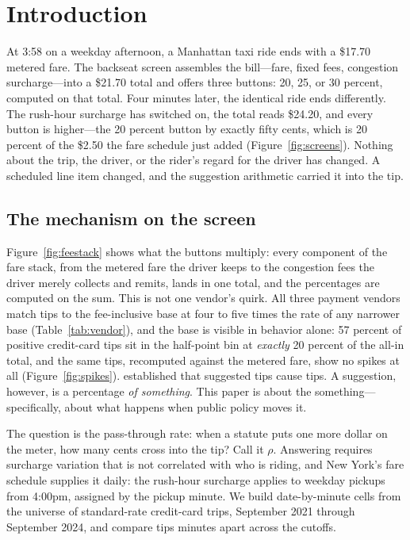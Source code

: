 \section{Introduction}
\label{sec:introduction}

At 3:58 on a weekday afternoon, a Manhattan taxi ride ends with a
\$17.70 metered fare. The backseat screen assembles the bill---fare,
fixed fees, congestion surcharge---into a \$21.70 total and offers three
buttons: 20, 25, or 30 percent, computed on that total. Four minutes
later, the identical ride ends differently. The rush-hour surcharge has
switched on, the total reads \$24.20, and every button is higher---the
20 percent button by exactly fifty cents, which is 20 percent of the
\$2.50 the fare schedule just added (Figure~\ref{fig:screens}). Nothing
about the trip, the driver, or the rider's regard for the driver has
changed. A scheduled line item changed, and the suggestion arithmetic
carried it into the tip.

\subsection{The mechanism on the screen}
Figure~\ref{fig:feestack} shows what the buttons multiply: every
component of the fare stack, from the metered fare the driver keeps to
the congestion fees the driver merely collects and remits, lands in one
total, and the percentages are computed on the sum. This is not one
vendor's quirk. All three payment vendors match tips to the
fee-inclusive base at four to five times the rate of any narrower base
(Table~\ref{tab:vendor}), and the base is visible in behavior alone:
57 percent of positive credit-card tips sit in the half-point bin at
\emph{exactly} 20 percent of the all-in total, and the same tips,
recomputed against the metered fare, show no spikes at all
(Figure~\ref{fig:spikes}). \textcite{haggag2014default} established
that suggested tips cause tips. A suggestion, however, is a percentage
\emph{of something}. This paper is about the something---specifically,
about what happens when public policy moves it.

The question is the pass-through rate: when a statute puts one more
dollar on the meter, how many cents cross into the tip? Call it $\rho$.
Answering requires surcharge variation that is not correlated with who
is riding, and New York's fare schedule supplies it daily: the
rush-hour surcharge applies to weekday pickups from 4:00pm, assigned by
the pickup minute. We build date-by-minute cells from the universe of
standard-rate credit-card trips, September 2021 through September 2024,
and compare tips minutes apart across the cutoffs.

